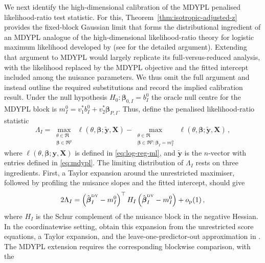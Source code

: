 \documentclass{article}
\theoremstyle{definition}
\newcommand*{\bb}{\boldsymbol}
\newcommand{\betady}{\ensuremath{\hat{\bbeta}^{\textrm{\tiny DY}}}}
\def\bX{\bb{X}}
\def\bY{\bb{y}}
\def\bYtil{\widetilde{\bb{y}}}
\def\bbeta{\bb{\beta}}
\begin{document}
\begin{bibunit}
We next identify the high-dimensional calibration of the MDYPL
penalised likelihood-ratio test statistic. 
For this, 
Theorem~\ref{thm:isotropic-adjusted-z} provides the
fixed-block Gaussian limit that forms the distributional ingredient of
an MDYPL analogue of the high-dimensional likelihood-ratio theory for
logistic maximum likelihood developed by \citet{sur+candes:2019} (see
\citealt[Theorem~6 and Section~3.11]{sur:2019} for the detailed argument).
Extending that argument to MDYPL would largely replicate its
full-versus-reduced analysis, with the likelihood replaced by the MDYPL
objective and the fitted intercept included among the nuisance parameters.
We thus omit the full argument and instead outline the required substitutions and record the implied calibration result.
Under the null hypothesis
$
    H_0:\bbeta_{0,I}=b_I^0
$
the oracle null centre for the MDYPL block is
$
    m_I^0
    =
    v_1^*b_I^0+v_2^*\bbeta_{P,I}
$. Thus, define the penalised likelihood-ratio statistic
\begin{equation}
\label{eq:oracle-PLR-definition}
    \Lambda_I
    =
    \underset{\substack{
        \theta\in\Re\\
        \bbeta\in\Re^p
    }}{\max} \, 
    \ell(\theta,\bbeta;\bYtil,\bX)
	-
    \underset{\substack{
        \theta\in\Re\\
        \bbeta\in\Re^p:  \bbeta_I=m_I^0
    }}{\max} \, 
    \ell(\theta,\bbeta;\bYtil,\bX)
    \,,
\end{equation}
where $\ell(\theta,\bbeta;\bY,\bX)$ is defined in
\eqref{eq:log-reg-ml}, and $\bYtil$ is the $n$-vector with entries
defined in \eqref{eq:mdypl}.
The limiting distribution of $\Lambda_I$ rests on three ingredients. First,
a Taylor expansion around the unrestricted maximiser, followed by profiling
the nuisance slopes and the fitted intercept, should give
\begin{equation}
\label{eq:adjusted-PLR-profile-expansion}
    2\Lambda_I
    =
    \left(
        \betady_I-m_I^0
    \right)^\top
    H_{I}
    \left(
        \betady_I-m_I^0
    \right)
    +
    o_{\mathrm p}(1)
    \,,
\end{equation}
where $H_{I}$ is the Schur complement of the
nuisance block in the negative Hessian. In the coordinatewise setting,
\citet[Theorem~12, equations~(3.147)--(3.152)]{sur:2019} obtain this
expansion from the unrestricted score equations, a Taylor expansion, and the
leave-one-predictor-out approximation in
\citet[Theorem~11, equations~(3.106)--(3.111)]{sur:2019}. The MDYPL
extension requires the corresponding blockwise comparison, with the

\end{bibunit}
\end{document}
